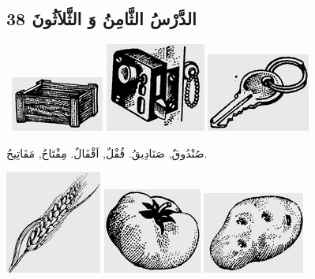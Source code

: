 \documentclass[a5paper]{article}
\begin{document}
\subsection{الدَّرْسُ الثَّامِنُ وَ الثَّلاَثُونَ 38}
\  \includegraphics[width=1.198in,height=0.7083in]{MuhammadBagauddinlatinized-img096.png}   \includegraphics[width=1.2917in,height=1.1457in]{MuhammadBagauddinlatinized-img097.png}   \includegraphics[width=1.3335in,height=1.0102in]{MuhammadBagauddinlatinized-img098.png} 

صُنْدُوقٌ, صَنَادِيقُ. قُفْلٌ, اَقْفَالٌ. مِفْتَاحٌ, مَفَاتِيحُ. 

 \includegraphics[width=1.2398in,height=1.3335in]{MuhammadBagauddinlatinized-img099.png}   \includegraphics[width=1.2709in,height=1.1043in]{MuhammadBagauddinlatinized-img100.png}   \includegraphics[width=1.3126in,height=1.052in]{MuhammadBagauddinlatinized-img101.png} 
\end{document}
